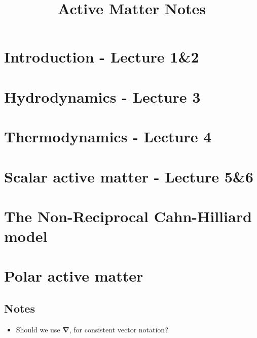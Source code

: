 \documentclass[10pt, a4paper, oneside]{book}
\title{Active Matter Notes}
\begin{document}
    \maketitle
    \clearpage


    \tableofcontents
    \clearpage

    \setlength{\parindent}{0em}
    \setlength{\parskip}{0.8em}


    \chapter{Introduction - Lecture 1\&2}
    

    \chapter{Hydrodynamics - Lecture 3}
    

    \chapter{Thermodynamics - Lecture 4}
     

    \chapter{Scalar active matter - Lecture 5\&6}
    

    \chapter{The Non-Reciprocal Cahn-Hilliard model}
    

    \chapter{Polar active matter}
    


    
    

    
    \setcounter{tocdepth}{1}
    \listoftodos
    
    \section*{Notes}
    \begin{itemize}
        \item Should we use $\bm \nabla$, for consistent vector notation?
    \end{itemize}
\end{document}
